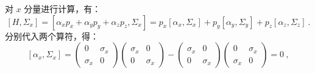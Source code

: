 对 $x$ 分量进行计算，有：
\begin{equation}
\left[H, \Sigma_{x}\right]=\left[\alpha_{x} p_{x}+\alpha_{y} p_{y}+\alpha_{z} p_{z}, \Sigma_{x}\right]=p_{x}\left[\alpha_{x}, \Sigma_{x}\right]+p_{y}\left[\alpha_{y}, \Sigma_{y}\right]+p_{z}\left[\alpha_{z}, \Sigma_{z}\right]~.
\end{equation}
分别代入两个算符，得：
\begin{equation}\label{eq_qed4_26}
\left[\alpha_{x}, \Sigma_{x}\right] = \left(\begin{array}{cc}
0 & \sigma_{x} \\
\sigma_{x} & 0
\end{array}\right)\left(\begin{array}{cc}
\sigma_{x} & 0 \\
0 & \sigma_{x}
\end{array}\right)-\left(\begin{array}{cc}
\sigma_{x} & 0 \\
0 & \sigma_{x}
\end{array}\right)\left(\begin{array}{cc}
0 & \sigma_{x} \\
\sigma_{x} & 0
\end{array}\right) = 0~,
\end{equation}

